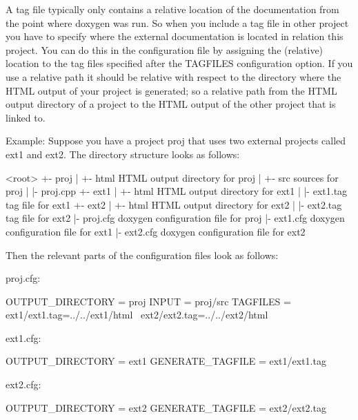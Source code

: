 A tag file typically only contains a relative location of the documentation from the point where doxygen was run. So when you include a tag file in other project you have to specify where the external documentation is located in relation this project. You can do this in the configuration file by assigning the (relative) location to the tag files specified after the TAGFILES configuration option. If you use a relative path it should be relative with respect to the directory where the HTML output of your project is generated; so a relative path from the HTML output directory of a project to the HTML output of the other project that is linked to.

\begin{DoxyParagraph}{Example\+: }
Suppose you have a project {\ttfamily proj} that uses two external projects called {\ttfamily ext1} and {\ttfamily ext2}. The directory structure looks as follows\+:
\end{DoxyParagraph}
\begin{DoxyParagraph}{}
\begin{DoxyVerb}<root>
  +- proj
  |   +- html               HTML output directory for proj
  |   +- src                sources for proj
  |   |- proj.cpp
  +- ext1
  |   +- html               HTML output directory for ext1
  |   |- ext1.tag           tag file for ext1
  +- ext2
  |   +- html               HTML output directory for ext2
  |   |- ext2.tag           tag file for ext2
  |- proj.cfg               doxygen configuration file for proj
  |- ext1.cfg               doxygen configuration file for ext1
  |- ext2.cfg               doxygen configuration file for ext2
\end{DoxyVerb}

\end{DoxyParagraph}
\begin{DoxyParagraph}{}
Then the relevant parts of the configuration files look as follows\+: 
\end{DoxyParagraph}
\begin{DoxyParagraph}{}
proj.\+cfg\+: \begin{DoxyVerb}OUTPUT_DIRECTORY  = proj
INPUT             = proj/src
TAGFILES          = ext1/ext1.tag=../../ext1/html \
                    ext2/ext2.tag=../../ext2/html 
\end{DoxyVerb}
 ext1.\+cfg\+: \begin{DoxyVerb}OUTPUT_DIRECTORY  = ext1
GENERATE_TAGFILE  = ext1/ext1.tag 
\end{DoxyVerb}
 ext2.\+cfg\+: \begin{DoxyVerb}OUTPUT_DIRECTORY  = ext2
GENERATE_TAGFILE  = ext2/ext2.tag
\end{DoxyVerb}

\end{DoxyParagraph}
 